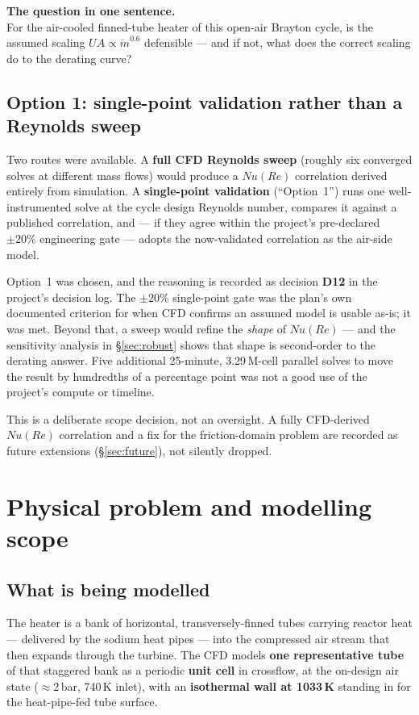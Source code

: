 \documentclass[11pt]{article}
\newcommand{\mdot}{\dot m}
\newcommand{\keybox}[2]{%
  \begin{center}\colorbox{boxbg}{\begin{minipage}{0.94\linewidth}\vspace{3pt}
  \textbf{#1}\\[2pt]#2\vspace{3pt}\end{minipage}}\end{center}}
\begin{document}
\keybox{The question in one sentence.}{For the air-cooled finned-tube heater of this open-air Brayton cycle,
is the assumed scaling $UA\propto\mdot^{0.6}$ defensible --- and if not, what does the correct scaling do to
the derating curve?}

\subsection{Option 1: single-point validation rather than a Reynolds sweep}

Two routes were available. A \textbf{full CFD Reynolds sweep} (roughly six converged solves at different mass
flows) would produce a $Nu(Re)$ correlation derived entirely from simulation. A \textbf{single-point
validation} (``Option~1'') runs one well-instrumented solve at the cycle design Reynolds number, compares it
against a published correlation, and --- if they agree within the project's pre-declared $\pm20\%$ engineering
gate --- adopts the now-validated correlation as the air-side model.

Option~1 was chosen, and the reasoning is recorded as decision \textbf{D12} in the project's decision log. The
$\pm20\%$ single-point gate was the plan's own documented criterion for when CFD confirms an assumed model is
usable as-is; it was met. Beyond that, a sweep would refine the \emph{shape} of $Nu(Re)$ --- and the
sensitivity analysis in \S\ref{sec:robust} shows that shape is second-order to the derating answer. Five
additional 25-minute, 3.29\,M-cell parallel solves to move the result by hundredths of a percentage point was
not a good use of the project's compute or timeline.

This is a deliberate scope decision, not an oversight. A fully CFD-derived $Nu(Re)$ correlation and a fix for
the friction-domain problem are recorded as future extensions (\S\ref{sec:future}), not silently dropped.


\section{Physical problem and modelling scope}

\subsection{What is being modelled}

The heater is a bank of horizontal, transversely-finned tubes carrying reactor heat --- delivered by the
sodium heat pipes --- into the compressed air stream that then expands through the turbine. The CFD models
\textbf{one representative tube} of that staggered bank as a periodic \textbf{unit cell} in crossflow, at the
on-design air state ($\approx$2\,bar, 740\,K inlet), with an \textbf{isothermal wall at 1033\,K} standing in
for the heat-pipe-fed tube surface.
\end{document}
